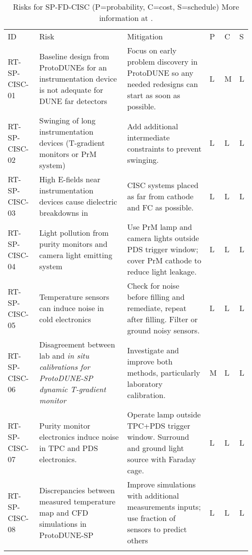 
\begin{footnotesize}
\begin{longtable}{P{0.18\textwidth}P{0.20\textwidth}P{0.32\textwidth}P{0.02\textwidth}P{0.02\textwidth}P{0.02\textwidth}} 
\caption[Risks for SP-FD-CISC]{Risks for SP-FD-CISC (P=probability, C=cost, S=schedule) More information at . } \\
ID & Risk & Mitigation & P & C & S  \\  \colhline
RT-SP-CISC-01 & Baseline design from ProtoDUNEs for an instrumentation device is not adequate for DUNE far detectors & Focus on early problem discovery in ProtoDUNE so any needed redesigns can start as soon as possible. & L & M & L \\  \colhline
RT-SP-CISC-02 & Swinging of long instrumentation devices (T-gradient monitors or PrM system) & Add additional intermediate constraints to prevent swinging. & L & L & L \\  \colhline
RT-SP-CISC-03 & High E-fields near instrumentation devices cause dielectric breakdowns in  & CISC systems placed as far from cathode and FC as possible. & L & L & L \\  \colhline
RT-SP-CISC-04 & Light pollution from purity monitors and camera light emitting system & Use PrM lamp and camera lights outside PDS trigger window; cover PrM cathode to reduce light leakage. & L & L & L \\  \colhline
RT-SP-CISC-05 & Temperature sensors can induce noise in cold electronics & Check for noise before filling and remediate, repeat after filling. Filter or ground noisy sensors. & L & L  & L \\  \colhline
RT-SP-CISC-06 & Disagreement between lab and \em{in situ} calibrations for ProtoDUNE-SP dynamic T-gradient monitor & Investigate and improve both methods, particularly laboratory calibration. & M & L & L \\  \colhline
RT-SP-CISC-07 & Purity monitor electronics induce noise in TPC and PDS electronics. & Operate lamp outside TPC+PDS trigger window. Surround and ground light source with Faraday cage. & L & L & L \\  \colhline
RT-SP-CISC-08 & Discrepancies between measured temperature map and CFD simulations in ProtoDUNE-SP & Improve simulations with additional measurements inputs; use fraction of sensors to predict others   & L & L & L \\  \colhline

\end{longtable}
\end{footnotesize}
